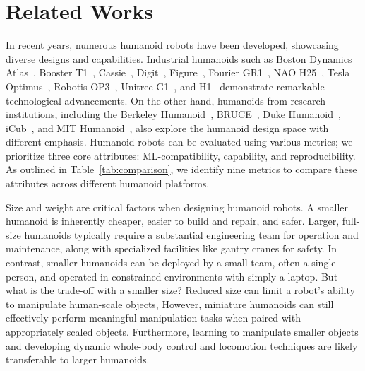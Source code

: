 \section{Related Works}
\label{sec:related_works}

In recent years, numerous humanoid robots have been developed, showcasing diverse designs and capabilities. Industrial humanoids such as Boston Dynamics Atlas~\citep{atlas}, Booster T1~\citep{humanoid}, Cassie~\citep{cassie}, Digit~\citep{agility}, Figure~\citep{figure}, Fourier GR1~\citep{fourierrobotics}, NAO H25~\citep{nao}, Tesla Optimus~\citep{ai}, Robotis OP3~\citep{nameintroduction}, Unitree G1~\citep{unitreea}, and H1~\citep{unitree} demonstrate remarkable technological advancements. 
On the other hand, humanoids from research institutions, including the Berkeley Humanoid~\citep{liao2024berkeley}, BRUCE~\citep{liu2022design}, Duke Humanoid~\citep{xia2024duke}, iCub~\citep{parmiggiani2012design}, and MIT Humanoid~\citep{chignoli2021mit}, also explore the humanoid design space with different emphasis. 
Humanoid robots can be evaluated using various metrics; we prioritize three core attributes: ML-compatibility, capability, and reproducibility. As outlined in Table~\ref{tab:comparison}, we identify nine metrics to compare these attributes across different humanoid platforms.

Size and weight are critical factors when designing humanoid robots. A smaller humanoid is inherently cheaper, easier to build and repair, and safer. Larger, full-size humanoids typically require a substantial engineering team for operation and maintenance, along with specialized facilities like gantry cranes for safety. In contrast, smaller humanoids can be deployed by a small team, often a single person, and operated in constrained environments with simply a laptop.
But what is the trade-off with a smaller size? Reduced size can limit a robot’s ability to manipulate human-scale objects, However, miniature humanoids can still effectively perform meaningful manipulation tasks when paired with appropriately scaled objects. Furthermore, learning to manipulate smaller objects and developing dynamic whole-body control and locomotion techniques are likely transferable to larger humanoids.

